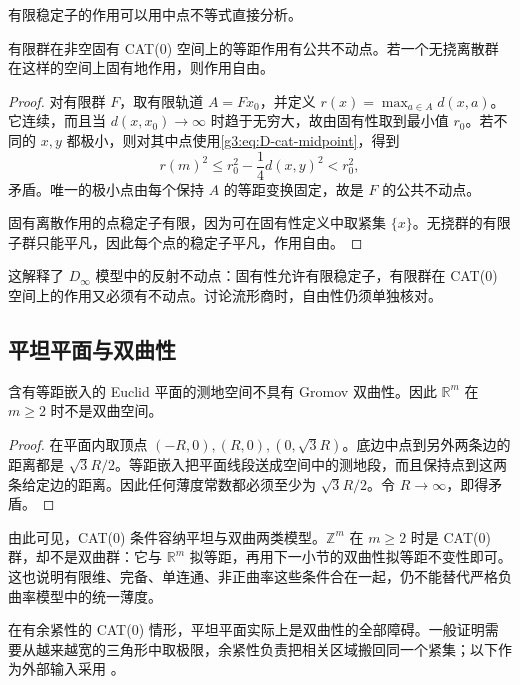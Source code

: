 \ProseParagraphBreak

有限稳定子的作用可以用中点不等式直接分析。

\begin{proposition}\label{g3:prop:D-finite-cat-fixed-point}
	有限群在非空固有 CAT(0) 空间上的等距作用有公共不动点。若一个无挠离散群在这样的空间上固有地作用，则作用自由。
\end{proposition}
\begin{proof}
	对有限群 \(F\)，取有限轨道 \(A=Fx_0\)，并定义 \(r(x)=\max_{a\in A}d(x,a)\)。它连续，而且当 \(d(x,x_0)\to\infty\) 时趋于无穷大，故由固有性取到最小值 \(r_0\)。若不同的 \(x,y\) 都极小，则对其中点使用\cref{g3:eq:D-cat-midpoint}，得到
	\[
		r(m)^2\le r_0^2-\frac14d(x,y)^2<r_0^2,
	\]
	矛盾。唯一的极小点由每个保持 \(A\) 的等距变换固定，故是 \(F\) 的公共不动点。

	固有离散作用的点稳定子有限，因为可在固有性定义中取紧集 \(\{x\}\)。无挠群的有限子群只能平凡，因此每个点的稳定子平凡，作用自由。
\end{proof}

这解释了 \(D_\infty\) 模型中的反射不动点：固有性允许有限稳定子，有限群在 CAT(0) 空间上的作用又必须有不动点。讨论流形商时，自由性仍须单独核对。

\subsection{平坦平面与双曲性}
\label{g3:subsec:D03:05}

\begin{proposition}\label{g3:prop:D-flat-obstruction}
	含有等距嵌入的 Euclid 平面的测地空间不具有 Gromov 双曲性。因此 \(\mathbb R^m\) 在 \(m\ge2\) 时不是双曲空间。
\end{proposition}
\begin{proof}
	在平面内取顶点 \((-R,0),(R,0),(0,\sqrt3R)\)。底边中点到另外两条边的距离都是 \(\sqrt3R/2\)。等距嵌入把平面线段送成空间中的测地段，而且保持点到这两条给定边的距离。因此任何薄度常数都必须至少为 \(\sqrt3R/2\)。令 \(R\to\infty\)，即得矛盾。
\end{proof}

由此可见，CAT(0) 条件容纳平坦与双曲两类模型。\(\mathbb Z^m\) 在 \(m\ge2\) 时是 CAT(0) 群，却不是双曲群：它与 \(\mathbb R^m\) 拟等距，再用下一小节的双曲性拟等距不变性即可。这也说明有限维、完备、单连通、非正曲率这些条件合在一起，仍不能替代严格负曲率模型中的统一薄度。

\ProseParagraphBreak

在有余紧性的 CAT(0) 情形，平坦平面实际上是双曲性的全部障碍。一般证明需要从越来越宽的三角形中取极限，余紧性负责把相关区域搬回同一个紧集；以下作为外部输入采用 \cite[定理III.H.1.5，第400页]{BridsonHaefliger1999MetricSpaces}。

